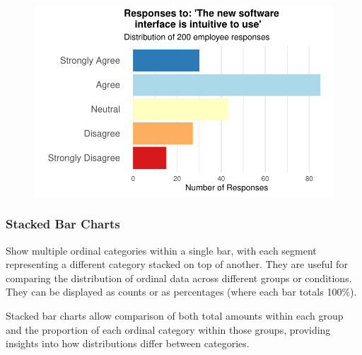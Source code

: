 \documentclass[
  letterpaper,
  DIV=11,
  numbers=noendperiod]{scrartcl}
\begin{document}
\begin{figure}[H]

{\centering \includegraphics{Ordinal_data_an_R_files/figure-pdf/unnamed-chunk-2-1.pdf}

}

\end{figure}

\hypertarget{stacked-bar-charts}{%
\subsubsection*{Stacked Bar Charts}\label{stacked-bar-charts}}

Show multiple ordinal categories within a single bar, with each segment
representing a different category stacked on top of another. They are
useful for comparing the distribution of ordinal data across different
groups or conditions. They can be displayed as counts or as percentages
(where each bar totals 100\%).

Stacked bar charts allow comparison of both total amounts within each
group and the proportion of each ordinal category within those groups,
providing insights into how distributions differ between categories.
\end{document}
